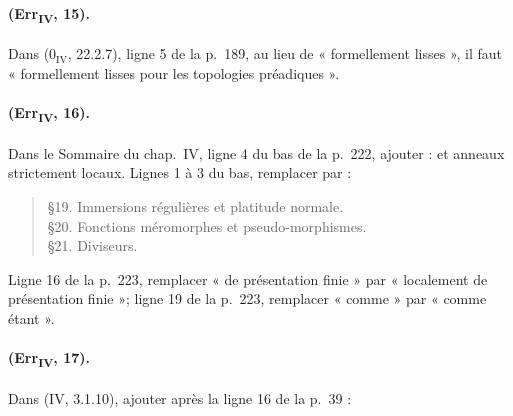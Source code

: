 \paragraph{(Err\textsubscript{IV}, 15).}
Dans ($0_{\mathrm{IV}}$, 22.2.7), ligne 5 de la p.~189, au lieu de
« formellement lisses », il faut « formellement lisses pour les
topologies préadiques ».

\paragraph{(Err\textsubscript{IV}, 16).}
Dans le Sommaire du chap.~IV, ligne 4 du bas de la p.~222, ajouter :
et anneaux strictement locaux. Lignes 1 à 3 du bas, remplacer par :
\begin{quote}
\S19. Immersions régulières et platitude normale.\\
\S20. Fonctions méromorphes et pseudo-morphismes.\\
\S21. Diviseurs.
\end{quote}
Ligne 16 de la p.~223, remplacer « de présentation finie » par
« localement de présentation finie »; ligne 19 de la p.~223, remplacer
« comme » par « comme étant ».

\paragraph{(Err\textsubscript{IV}, 17).}
Dans (IV, 3.1.10), ajouter après la ligne 16 de la p.~39 :

